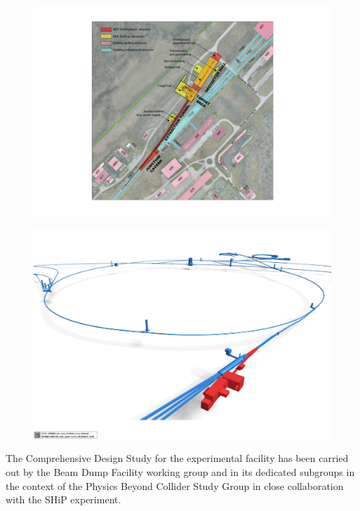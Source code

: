 \begin{figure}[th]
\centering
\includegraphics[width=1.0\columnwidth]{figs/BeamLine/20180529-BDF-Figure_for_BDF_paper.pdf}
\caption{}
\label{fig:FacilityLocation}
\end{figure}

\begin{figure}[th]
\centering
\includegraphics[width=1.0\columnwidth]{figs/BeamLine/20180601-BDF-3D_view_2.pdf}
\caption{}
\label{fig:FacilityAccComplex}
\end{figure}

The Comprehensive Design Study for the experimental facility has been carried out by the 
Beam Dump Facility working group and in its dedicated subgroups in the context of the Physics Beyond Collider Study Group in 
close collaboration with the SHiP experiment.  

